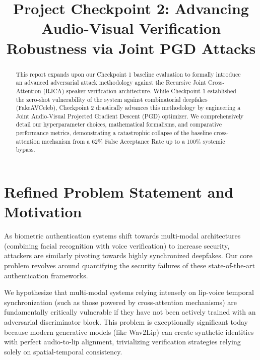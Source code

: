 \documentclass[conference]{IEEEtran}
\begin{document}
\title{Project Checkpoint 2: Advancing Audio-Visual Verification Robustness via Joint PGD Attacks}

\author{
}

\maketitle

\begin{abstract}
This report expands upon our Checkpoint 1 baseline evaluation to formally introduce an advanced adversarial attack methodology against the Recursive Joint Cross-Attention (RJCA) speaker verification architecture. While Checkpoint 1 established the zero-shot vulnerability of the system against combinatorial deepfakes (FakeAVCeleb), Checkpoint 2 drastically advances this methodology by engineering a Joint Audio-Visual Projected Gradient Descent (PGD) optimizer. We comprehensively detail our hyperparameter choices, mathematical formalisms, and comparative performance metrics, demonstrating a catastrophic collapse of the baseline cross-attention mechanism from a 62\% False Acceptance Rate up to a 100\% systemic bypass.
\end{abstract}

\section{Refined Problem Statement and Motivation}
As biometric authentication systems shift towards multi-modal architectures (combining facial recognition with voice verification) to increase security, attackers are similarly pivoting towards highly synchronized deepfakes. Our core problem revolves around quantifying the security failures of these state-of-the-art authentication frameworks. 

We hypothesize that multi-modal systems relying intensely on lip-voice temporal synchronization (such as those powered by cross-attention mechanisms) are fundamentally critically vulnerable if they have not been actively trained with an adversarial discriminator block. This problem is exceptionally significant today because modern generative models (like Wav2Lip) can create synthetic identities with perfect audio-to-lip alignment, trivializing verification strategies relying solely on spatial-temporal consistency. 
\end{document}
